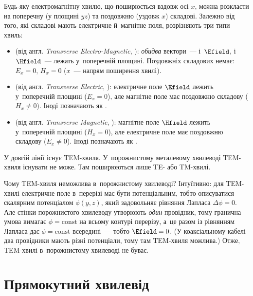 Будь-яку електромагнітну хвилю, що поширюється вздовж осі $x$, можна розкласти на поперечну (у площині $yz$) та поздовжню (уздовж $x$) складові. Залежно від того, які складові мають електричне й~магнітне поля, розрізняють три типи хвиль:

\begin{itemize}
	\item {} (від англ. \emph{Transverse Electro-Magnetic}, ): \emph{обидва} вектори~--- і~$\Efield$, і~$\Hfield$~--- лежать у~поперечній площині. Поздовжніх складових немає: $E_x = 0$, $H_x = 0$ ($x$~--- напрям поширення хвилі).
	\item {} (від англ. \emph{Transverse Electric}, ): електричне поле $\Efield$ лежить у~поперечній площині ($E_x = 0$), але магнітне поле має поздовжню складову ($H_x \neq 0$). Іноді позначають як .
	\item {} (від англ. \emph{Transverse Magnetic}, ): магнітне поле $\Hfield$ лежить у~поперечній площині ($H_x = 0$), але електричне поле має поздовжню складову ($E_x \neq 0$). Іноді позначають як .
\end{itemize}

У довгій лінії існує TEM-хвиля. У~порожнистому металевому хвилеводі TEM-хвиля існувати не може. Там поширюються лише TE- або TM-хвилі.

\begin{Attention}
	Чому TEM-хвиля неможлива в~порожнистому хвилеводі? Інтуїтивно: для TEM-хвилі електричне поле в~перерізі має бути потенціальним, тобто описуватися скалярним потенціалом $\phi(y,z)$, який задовольняє рівняння Лапласа $\Delta \phi = 0$. Але стінки порожнистого хвилеводу утворюють \emph{один} провідник, тому гранична умова вимагає $\phi = \text{const}$ на всьому контурі перерізу, а~це разом із рівнянням Лапласа дає $\phi = \text{const}$ всередині~--- тобто $\Efield = 0$. (У коаксіальному кабелі два провідники мають різні потенціали, тому там TEM-хвиля можлива.) Отже, TEM-хвилі в~порожнистому хвилеводі не буває.
\end{Attention}

\section{Прямокутний хвилевід}\hypertarget{rectangular-waveguide}{}

